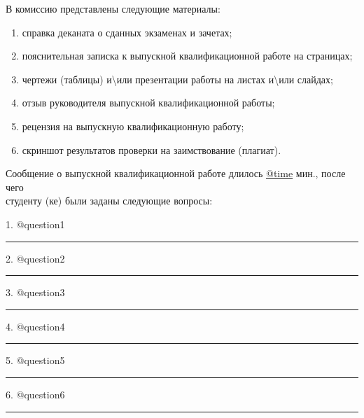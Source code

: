 \documentclass[a4paper,12pt]{article} %
\begin{document}
\hspace{-0.25cm}В комиссию представлены следующие материалы:
\vspace{-0.25cm}
\begin{enumerate}	
	\item  	справка деканата о сданных экзаменах и зачетах;
	\vspace{-0.3cm}
	\item  	пояснительная записка к выпускной квалификационной работе на \makebox[10mm]{\hrulefill} страницах;
	\vspace{-0.3cm}
	\item   чертежи (таблицы) и\textbackslash{}или презентации работы на \makebox[10mm]{\hrulefill}		 листах и\textbackslash{}или 	\makebox[10mm]{\hrulefill}		слайдах;
	\vspace{-0.3cm}
	\item 	отзыв руководителя выпускной квалификационной работы;
	\vspace{-0.3cm}
	\item	рецензия на выпускную квалификационную работу;
	\vspace{-0.3cm}
	\item  	скриншот результатов проверки на заимствование (плагиат).
\end{enumerate}

\hspace{-0.15cm}Сообщение о выпускной квалификационной работе длилось \underline{@time} мин., после чего\\
 студенту (ке) были заданы следующие вопросы:\\
\vspace{-0.5cm} 
\begin{flushleft}
	  	1. @question1
	  	\smallskip\hrule
	  	\vspace{0.3cm} 
	  	2. @question2
	  	\smallskip\hrule
	  	\vspace{0.3cm}
	  	3. @question3 
	  	\smallskip\hrule
	  	\vspace{0.3cm} 
	  	4. @question4
	  	\smallskip\hrule
	  	\vspace{0.3cm} 
	  	5. @question5
	  	\smallskip\hrule
	  	\vspace{0.3cm} 
	  	6. @question6
	  	\smallskip\hrule
	  	\vspace{0.3cm} 	 	
	  	
\end{flushleft}

\pagebreak

\hfill \break
\hfill \break
\thispagestyle{empty}
 
\end{document}
